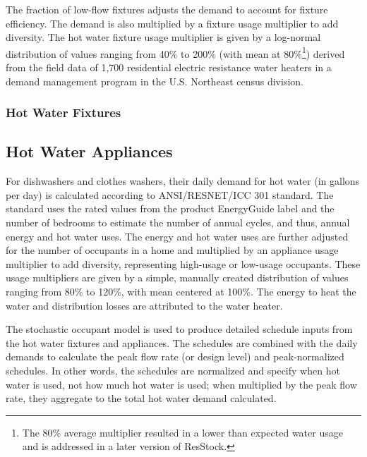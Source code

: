 
The fraction of low-flow fixtures adjusts the demand to account for fixture efficiency. The demand is also multiplied by a fixture usage multiplier to add diversity. The hot water fixture usage multiplier is given by a log-normal distribution of values ranging from 40\% to 200\% (with mean at 80\%\footnote{The 80\% average multiplier resulted in a lower than expected water usage and is addressed in a later version of ResStock.}) derived from the field data of 1,700 residential electric resistance water heaters in a demand management program in the U.S. Northeast census division.

\subsubsection{Hot Water Fixtures}\label{hot_water_fixtures}


\subsection{Hot Water Appliances}
For dishwashers and clothes washers, their daily demand for hot water (in gallons per day) is calculated according to ANSI/RESNET/ICC 301 standard. The standard uses the rated values from the product EnergyGuide label and the number of bedrooms to estimate the number of annual cycles, and thus, annual energy and hot water uses. The energy and hot water uses are further adjusted for the number of occupants in a home and multiplied by an appliance usage multiplier to add diversity, representing high-usage or low-usage occupants. These usage multipliers are given by a simple, manually created distribution of values ranging from 80\% to 120\%, with mean centered at 100\%. The energy to heat the water and distribution losses are attributed to the water heater.

The stochastic occupant model is used to produce detailed schedule inputs from the hot water fixtures and appliances. The schedules are combined with the daily demands to calculate the peak flow rate (or design level) and peak-normalized schedules. In other words, the schedules are normalized and specify when hot water is used, not how much hot water is used; when multiplied by the peak flow rate, they aggregate to the total hot water demand calculated.

